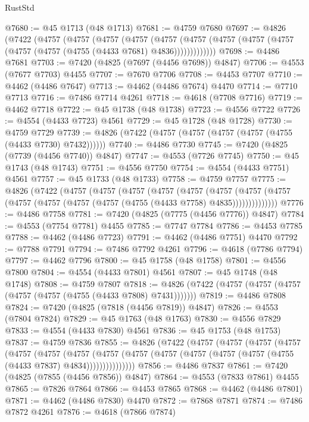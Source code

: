 \begin{lexlean}{RustStd}
\begin{coremodule}
@7680 := @45 @1713 (@48 @1713)
@7681 := @4759 @7680
@7697 := @4826
    (@7422
      (@4757
        (@4757
          (@4757
            (@4757
              (@4757
                (@4757 (@4757 (@4757 (@4757 (@4757 (@4757 (@4755 (@4433 @7681) @4836)))))))))))))
@7698 := @4486 @7681
@7703 := @7420 (@4825 (@7697 (@4456 @7698)) @4847)
@7706 := @4553 (@7677 @7703) @4455
@7707 := @7670 @7706
@7708 := @4453 @7707
@7710 := @4462 (@4486 @7647)
@7713 := @4462 (@4486 @7674) @4470
@7714 := @7710 @7713
@7716 := @7486 @7714 @4261
@7718 := @4618 (@7708 @7716)
@7719 := @4462 @7718
@7722 := @45 @1738 (@48 @1738)
@7723 := @4556 @7722
@7726 := @4554 (@4433 @7723) @4561
@7729 := @45 @1728 (@48 @1728)
@7730 := @4759 @7729
@7739 := @4826 (@7422 (@4757 (@4757 (@4757 (@4757 (@4755 (@4433 @7730) @7432))))))
@7740 := @4486 @7730
@7745 := @7420 (@4825 (@7739 (@4456 @7740)) @4847)
@7747 := @4553 (@7726 @7745)
@7750 := @45 @1743 (@48 @1743)
@7751 := @4556 @7750
@7754 := @4554 (@4433 @7751) @4561
@7757 := @45 @1733 (@48 @1733)
@7758 := @4759 @7757
@7775 := @4826
    (@7422
      (@4757
        (@4757
          (@4757
            (@4757
              (@4757
                (@4757
                  (@4757 (@4757 (@4757 (@4757 (@4757 (@4757 (@4755 (@4433 @7758) @4835))))))))))))))
@7776 := @4486 @7758
@7781 := @7420 (@4825 (@7775 (@4456 @7776)) @4847)
@7784 := @4553 (@7754 @7781) @4455
@7785 := @7747 @7784
@7786 := @4453 @7785
@7788 := @4462 (@4486 @7723)
@7791 := @4462 (@4486 @7751) @4470
@7792 := @7788 @7791
@7794 := @7486 @7792 @4261
@7796 := @4618 (@7786 @7794)
@7797 := @4462 @7796
@7800 := @45 @1758 (@48 @1758)
@7801 := @4556 @7800
@7804 := @4554 (@4433 @7801) @4561
@7807 := @45 @1748 (@48 @1748)
@7808 := @4759 @7807
@7818 := @4826 (@7422 (@4757 (@4757 (@4757 (@4757 (@4757 (@4755 (@4433 @7808) @7431)))))))
@7819 := @4486 @7808
@7824 := @7420 (@4825 (@7818 (@4456 @7819)) @4847)
@7826 := @4553 (@7804 @7824)
@7829 := @45 @1763 (@48 @1763)
@7830 := @4556 @7829
@7833 := @4554 (@4433 @7830) @4561
@7836 := @45 @1753 (@48 @1753)
@7837 := @4759 @7836
@7855 := @4826
    (@7422
      (@4757
        (@4757
          (@4757
            (@4757
              (@4757
                (@4757
                  (@4757
                    (@4757
                      (@4757 (@4757 (@4757 (@4757 (@4757 (@4755 (@4433 @7837) @4834)))))))))))))))
@7856 := @4486 @7837
@7861 := @7420 (@4825 (@7855 (@4456 @7856)) @4847)
@7864 := @4553 (@7833 @7861) @4455
@7865 := @7826 @7864
@7866 := @4453 @7865
@7868 := @4462 (@4486 @7801)
@7871 := @4462 (@4486 @7830) @4470
@7872 := @7868 @7871
@7874 := @7486 @7872 @4261
@7876 := @4618 (@7866 @7874)

\end{coremodule}
\end{lexlean}
